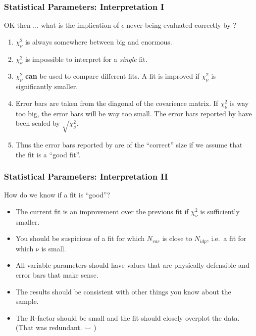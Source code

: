 \documentclass[10pt, xcolor=x11names, compress]{beamer}
\begin{document}
\begin{frame}
  \frametitle{Statistical Parameters: Interpretation I}

  \begin{exampleblock}{}
    OK then ... what is the implication of $\epsilon$ never being
    evaluated correctly by {\ifeffit}?
  \end{exampleblock}

  \begin{enumerate}[<+->]
  \item $\chi^2_\nu$ is always somewhere between big and enormous.
  \item $\chi^2_\nu$ is impossible to interpret for a \textit{single} fit.
  \item $\chi^2_\nu$ {\color{Green4}\textbf{can}} be used to compare
    different fits.  A fit is improved if $\chi^2_\nu$ is
    significantly smaller.
  \item Error bars are taken from the diagonal of the covarience
    matrix.  If $\chi^2_\nu$ is way too big, the error bars will be way
    too small.  The error bars reported by {\ifeffit} have been scaled
    by $\sqrt{\chi^2_\nu}$.
  \item Thus the error bars reported by {\ifeffit} are of the
    {\color{Green4}``correct''} size if we assume that the fit
    is a {\color{Green4}``good fit''}.
  \end{enumerate}
\end{frame}

\begin{frame}
  \frametitle{Statistical Parameters: Interpretation II}

  \begin{exampleblock}{}
    \begin{center}
      How do we know if a fit is ``good''?
    \end{center}
  \end{exampleblock}
  \begin{itemize}[<+->]
  \item The current fit is an improvement over the previous fit if
    $\chi^2_\nu$ is sufficiently smaller.
  \item You should be suspicious of a fit for which $N_{var}$ is close
    to $N_{idp}$, i.e.\ a fit for which $\nu$ is small.
  \item All variable parameters should have values that are physically
    defensible and error bars that make sense.
  \item The results should be consistent with other things you know
    about the sample.
  \item The R-factor should be small and the fit should closely
    overplot the data.  (That was redundant. $\ddot\smile$ )
  \end{itemize}
\end{frame}
\end{document}
